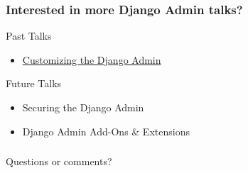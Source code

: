 \documentclass[aspectratio=169]{beamer}
\begin{document}
\begin{frame}
\frametitle{Interested in more Django Admin talks?}
  Past Talks
  \begin{itemize}
    \item {\small \href{https://github.com/davidfischer/talk-customizing-django-admin}{Customizing the Django Admin}}
  \end{itemize}

  \vfill

  Future Talks
  \begin{itemize}
    \item {\small Securing the Django Admin}
    \item {\small Django Admin Add-Ons \& Extensions}
  \end{itemize}
\end{frame}


\begin{frame}
\frametitle{}
  {\huge Questions or comments?}
\end{frame}
\end{document}
